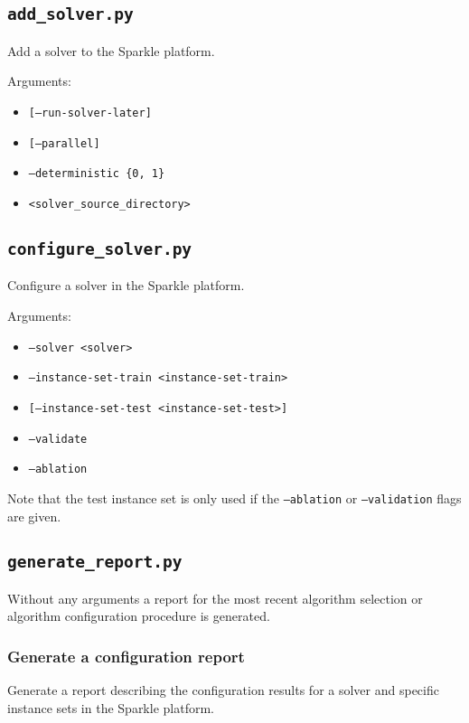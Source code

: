 \documentclass{article}
\begin{document}
\subsection{\texttt{add\_solver.py}}
\label{cmd:add_solver}
Add a solver to the Sparkle platform.

Arguments:
\begin{itemize}[noitemsep]
  \item[] \texttt{[--run-solver-later]}
  \item[] \texttt{[--parallel]}
  \item[] \texttt{--deterministic \{0, 1\}}
  \item[] \texttt{<solver\_source\_directory>}
\end{itemize}

\subsection{\texttt{configure\_solver.py}}
\label{cmd:configure_solver}
Configure a solver in the Sparkle platform.

Arguments:
\begin{itemize}[noitemsep]
  \item[] \texttt{--solver <solver>}
  \item[] \texttt{--instance-set-train <instance-set-train>}
  \item[] \texttt{[--instance-set-test <instance-set-test>]}
  \item[] \texttt{--validate}
  \item[] \texttt{--ablation}
\end{itemize}

Note that the test instance set is only used if the \texttt{--ablation} or \texttt{--validation} flags are given.

\subsection{\texttt{generate\_report.py}}
\label{cmd:generate_report}

Without any arguments a report for the most recent algorithm selection or algorithm configuration procedure is generated.

\subsubsection{Generate a configuration report}
Generate a report describing the configuration results for a solver and specific instance sets in the Sparkle platform.
\end{document}

